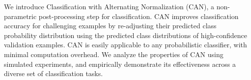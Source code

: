 We introduce Classification with Alternating Normalization (CAN), a non-parametric post-processing step for classification. CAN improves classification accuracy for challenging examples by re-adjusting their predicted class probability distribution using the predicted class distributions of high-confidence validation examples. CAN is easily applicable to any probabilistic classifier, with minimal computation overhead. We analyze the properties of CAN using simulated experiments, and empirically demonstrate its effectiveness across a diverse set of classification tasks.
